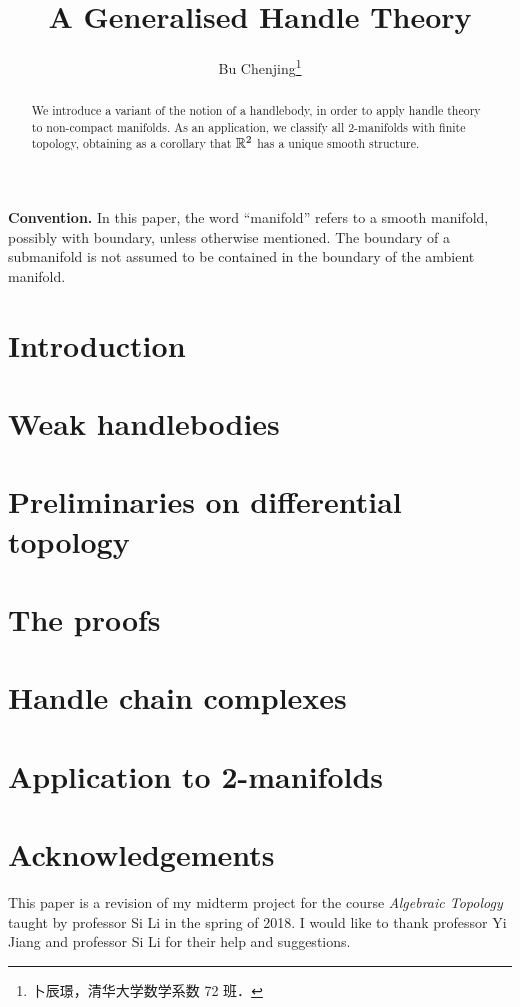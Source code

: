 \documentclass[twoside]{article}
\begin{document}
\title{A Generalised Handle Theory}
\author{Bu Chenjing\footnote{卜辰璟，清华大学数学系数 72 班．}}

\begin{abstract}
    We introduce a variant of the notion of a handlebody,
    in order to apply handle theory to non-compact manifolds.
    As an application, we classify all $2$-manifolds
    with finite topology, obtaining as a corollary that
    $\mathbb{R}^2$ has a unique smooth structure.
\end{abstract}

\noindent\textbf{Convention.}
In this paper, the word ``manifold''
refers to a smooth manifold, possibly with boundary,
unless otherwise mentioned.
The boundary of a submanifold is not assumed
to be contained in the boundary of the ambient manifold.

\section{Introduction}



\section{Weak handlebodies}



\section{Preliminaries on differential topology}



\section{The proofs}



\section{Handle chain complexes}



\section{Application to 2-manifolds}



\section*{Acknowledgements}

This paper is a revision of my midterm project
for the course \emph{Algebraic Topology}
taught by professor Si Li in the spring of 2018.
I would like to thank professor Yi Jiang and professor Si Li 
for their help and suggestions.


\end{document}

